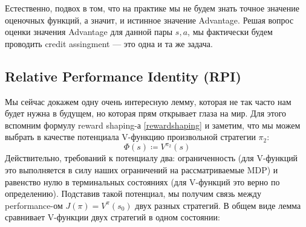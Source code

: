 Естественно, подвох в том, что на практике мы не будем знать точное значение оценочных функций, а значит, и истинное значение Advantage. Решая вопрос оценки значения Advantage для данной пары $s, a$, мы фактически будем проводить credit assingment --- это одна и та же задача.

\subsection{Relative Performance Identity (RPI)}

Мы сейчас докажем одну очень интересную лемму, которая не так часто нам будет нужна в будущем, но которая прям открывает глаза на мир. Для этого вспомним формулу reward shaping-а \eqref{rewardshaping} и заметим, что мы можем выбрать в качестве потенциала V-функцию произвольной стратегии $\pi_2$:
$$\Phi(s) \coloneqq V^{\pi_2}(s)$$
Действительно, требований к потенциалу два: ограниченность (для V-функций это выполняется в силу наших ограничений на рассматриваемые MDP) и равенство нулю в терминальных состояниях (для V-функций это верно по определению). Подставив такой потенциал, мы получим связь между performance-ом $J(\pi) = V^\pi(s_0)$ двух разных стратегий. В общем виде лемма сравнивает V-функции двух стратегий в одном состоянии:

